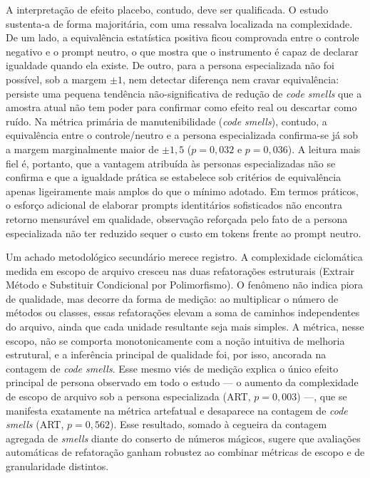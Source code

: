 \documentclass[10pt,conference,a4paper,twocolumn]{article}
\begin{document}
A interpretação de efeito placebo, contudo, deve ser qualificada. O estudo sustenta-a de forma majoritária, com uma ressalva localizada na complexidade. De um lado, a equivalência estatística positiva ficou comprovada entre o controle negativo e o prompt neutro, o que mostra que o instrumento é capaz de declarar igualdade quando ela existe. De outro, para a persona especializada não foi possível, sob a margem $\pm 1$, nem detectar diferença nem cravar equivalência: persiste uma pequena tendência não-significativa de redução de \textit{code smells} que a amostra atual não tem poder para confirmar como efeito real ou descartar como ruído. Na métrica primária de manutenibilidade (\textit{code smells}), contudo, a equivalência entre o controle/neutro e a persona especializada confirma-se já sob a margem marginalmente maior de $\pm 1{,}5$ ($p = 0{,}032$ e $p = 0{,}036$). A leitura mais fiel é, portanto, que a vantagem atribuída às personas especializadas não se confirma e que a igualdade prática se estabelece sob critérios de equivalência apenas ligeiramente mais amplos do que o mínimo adotado. Em termos práticos, o esforço adicional de elaborar prompts identitários sofisticados não encontra retorno mensurável em qualidade, observação reforçada pelo fato de a persona especializada não ter reduzido sequer o custo em tokens frente ao prompt neutro.

Um achado metodológico secundário merece registro. A complexidade ciclomática medida em escopo de arquivo cresceu nas duas refatorações estruturais (Extrair Método e Substituir Condicional por Polimorfismo). O fenômeno não indica piora de qualidade, mas decorre da forma de medição: ao multiplicar o número de métodos ou classes, essas refatorações elevam a soma de caminhos independentes do arquivo, ainda que cada unidade resultante seja mais simples. A métrica, nesse escopo, não se comporta monotonicamente com a noção intuitiva de melhoria estrutural, e a inferência principal de qualidade foi, por isso, ancorada na contagem de \textit{code smells}. Esse mesmo viés de medição explica o único efeito principal de persona observado em todo o estudo --- o aumento da complexidade de escopo de arquivo sob a persona especializada (ART, $p = 0{,}003$) ---, que se manifesta exatamente na métrica artefatual e desaparece na contagem de \textit{code smells} (ART, $p = 0{,}562$). Esse resultado, somado à cegueira da contagem agregada de \textit{smells} diante do conserto de números mágicos, sugere que avaliações automáticas de refatoração ganham robustez ao combinar métricas de escopo e de granularidade distintos.
\end{document}
